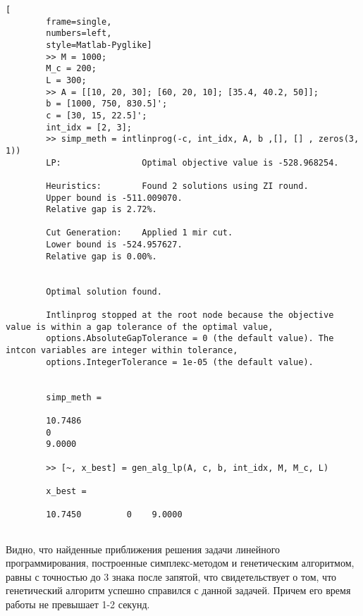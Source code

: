 \documentclass[../main.tex]{subfiles}
\begin{document}
	\begin{lstlisting}[
		frame=single,
		numbers=left,
		style=Matlab-Pyglike]
		>> M = 1000;
		M_c = 200;
		L = 300;
		>> A = [[10, 20, 30]; [60, 20, 10]; [35.4, 40.2, 50]];
		b = [1000, 750, 830.5]';
		c = [30, 15, 22.5]';
		int_idx = [2, 3];
		>> simp_meth = intlinprog(-c, int_idx, A, b ,[], [] , zeros(3, 1))
		LP:                Optimal objective value is -528.968254.                                          
		
		Heuristics:        Found 2 solutions using ZI round.                                                
		Upper bound is -511.009070.                                                      
		Relative gap is 2.72%.                                                          
		
		Cut Generation:    Applied 1 mir cut.                                                               
		Lower bound is -524.957627.                                                      
		Relative gap is 0.00%.                                                          
		
		
		Optimal solution found.
		
		Intlinprog stopped at the root node because the objective value is within a gap tolerance of the optimal value,
		options.AbsoluteGapTolerance = 0 (the default value). The intcon variables are integer within tolerance,
		options.IntegerTolerance = 1e-05 (the default value).
		
		
		simp_meth =
		
		10.7486
		0
		9.0000
		
		>> [~, x_best] = gen_alg_lp(A, c, b, int_idx, M, M_c, L)
		
		x_best =
		
		10.7450         0    9.0000
		
	\end{lstlisting}
	
	Видно, что найденные приближения решения задачи линейного программирования, построенные симплекс-методом и генетическим алгоритмом, равны с точностью до 3 знака после запятой, что свидетельствует о том, что генетический алгоритм успешно справился с данной задачей. Причем его время работы не превышает 1-2 секунд.
	
	
	
	
	
\end{document}
